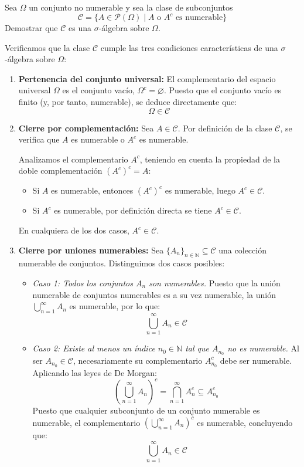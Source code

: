 \begin{problema}
Sea $\Omega$ un conjunto no numerable y sea la clase de subconjuntos
\[
    \mathcal{C} = \{ A \in \mathcal{P}(\Omega) \mid A \text{ o } A^c \text{ es numerable} \}
\]
Demostrar que $\mathcal{C}$ es una $\sigma$-álgebra sobre $\Omega$.

\tcblower

Verificamos que la clase $\mathcal{C}$ cumple las tres condiciones características de una $\sigma$-álgebra sobre $\Omega$:

\begin{enumerate}[label=\alph*)]
    \item \textbf{Pertenencia del conjunto universal:}
    El complementario del espacio universal $\Omega$ es el conjunto vacío, $\Omega^c = \varnothing$. Puesto que el conjunto vacío es finito (y, por tanto, numerable), se deduce directamente que:
    \[
        \Omega \in \mathcal{C}
    \]

    \item \textbf{Cierre por complementación:}
    Sea $A \in \mathcal{C}$. Por definición de la clase $\mathcal{C}$, se verifica que $A$ es numerable o $A^c$ es numerable.
    
    Analizamos el complementario $A^c$, teniendo en cuenta la propiedad de la doble complementación $(A^c)^c = A$:
    \begin{itemize}
        \item Si $A$ es numerable, entonces $(A^c)^c$ es numerable, luego $A^c \in \mathcal{C}$.
        \item Si $A^c$ es numerable, por definición directa se tiene $A^c \in \mathcal{C}$.
    \end{itemize}
    En cualquiera de los dos casos, $A^c \in \mathcal{C}$.

    \item \textbf{Cierre por uniones numerables:}
    Sea $\{A_n\}_{n \in \mathbb{N}} \subseteq \mathcal{C}$ una colección numerable de conjuntos. Distinguimos dos casos posibles:
    \begin{itemize}
        \item \textit{Caso 1: Todos los conjuntos $A_n$ son numerables.}
        Puesto que la unión numerable de conjuntos numerables es a su vez numerable, la unión $\bigcup_{n=1}^\infty A_n$ es numerable, por lo que:
        \[
            \bigcup_{n=1}^\infty A_n \in \mathcal{C}
        \]

        \item \textit{Caso 2: Existe al menos un índice $n_0 \in \mathbb{N}$ tal que $A_{n_0}$ no es numerable.}
        Al ser $A_{n_0} \in \mathcal{C}$, necesariamente su complementario $A_{n_0}^c$ debe ser numerable. Aplicando las leyes de De Morgan:
        \[
            \left( \bigcup_{n=1}^\infty A_n \right)^c = \bigcap_{n=1}^\infty A_n^c \subseteq A_{n_0}^c
        \]
        Puesto que cualquier subconjunto de un conjunto numerable es numerable, el complementario $\left( \bigcup_{n=1}^\infty A_n \right)^c$ es numerable, concluyendo que:
        \[
            \bigcup_{n=1}^\infty A_n \in \mathcal{C}
        \]
    \end{itemize}
\end{enumerate}


\end{problema}

